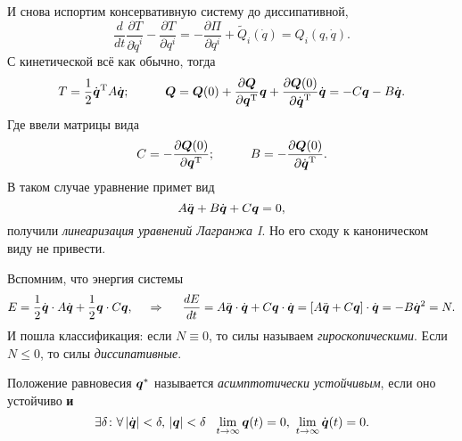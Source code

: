 И снова испортим консервативную систему до диссипативной,
\begin{equation*}
    \frac{d }{d t} \frac{\partial T}{\partial \dot{q}^i} - \frac{\partial T}{\partial q^i} = - \frac{\partial \Pi}{\partial q^i} + \tilde Q_i(\dot{q}) = Q_i(q, \dot{q}).
\end{equation*}
С кинетической всё как обычно, тогда
\begin{equation*}
    T = \frac{1}{2} \dot{\mbox{\boldmath $q$}}^{\text{T}} A \dot{\mbox{\boldmath $q$}};
    \hspace{1 cm}
    \mbox{\boldmath $Q$} = \mbox{\boldmath $Q$}(0) + \frac{\partial \mbox{\boldmath $Q$}}{\partial \mbox{\boldmath $q$}^{\text{T}}} \mbox{\boldmath $q$} + \frac{\partial \mbox{\boldmath $Q$}(0)}{\partial \dot{\mbox{\boldmath $q$}}^{\text{T}}} \dot{\mbox{\boldmath $q$}} = - C \mbox{\boldmath $q$} - B \dot{\mbox{\boldmath $q$}}.
\end{equation*}
Где ввели матрицы вида
\begin{equation*}
    C = - \frac{\partial \mbox{\boldmath $Q$}(0)}{\partial \mbox{\boldmath $q$}^{\text{T}}};
    \hspace{1 cm}
    B = - \frac{\partial \mbox{\boldmath $Q$} (0)}{\partial \dot{\mbox{\boldmath $q$}}^{\text{T}}}.
\end{equation*}
В таком случае уравнение примет вид
\begin{equation}
    A \ddot{\mbox{\boldmath $q$}} + B \dot{\mbox{\boldmath $q$}} + C \mbox{\boldmath $q$} = 0,
\end{equation}
получили \textit{линеаризация уравнений Лагранжа I}.
Но его сходу к каноническом виду не привести.

Вспомним, что энергия системы
\begin{equation*}
    E = \frac{1}{2} \dot{\mbox{\boldmath $q$}} \cdot A \dot{\mbox{\boldmath $q$}} + \frac{1}{2} \mbox{\boldmath $q$} \cdot C \mbox{\boldmath $q$},
    \hspace{0.5cm} \Rightarrow \hspace{0.5cm}
    \frac{d E}{d t} = A \ddot{\mbox{\boldmath $q$}} \cdot \dot{\mbox{\boldmath $q$}} + C \mbox{\boldmath $q$} \cdot \dot{\mbox{\boldmath $q$}} =
    \left[
        A \ddot{\mbox{\boldmath $q$}} + C \mbox{\boldmath $q$}
    \right] \cdot \dot{\mbox{\boldmath $q$}} = - B \dot{\mbox{\boldmath $q$}}^2 = N.
\end{equation*}
И пошла классификация: если $N \equiv 0$, то силы называем \textit{гироскопическими}. Если $N \leq 0$, то силы \textit{диссипативные}. 


\begin{to_def}
    Положение равновесия $\mbox{\boldmath $q$}^*$ называется \textit{асимптотически устойчивым}, если оно устойчиво \textbf{и} 
    \begin{equation*}
        \exists \delta \colon  \forall\,  |\dot{\vc{q}}| < \delta, \, |\vc{q}| < \delta \ \ 
        \lim_{t \to \infty} \vc{q}(t) = 0, \ 
        \lim_{t \to \infty} \dot{\vc{q}}(t) = 0.
    \end{equation*}
\end{to_def}


